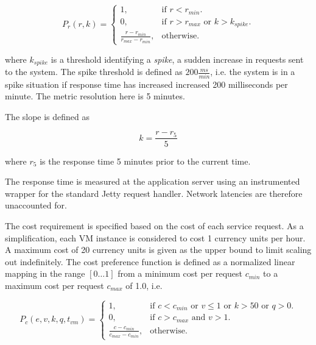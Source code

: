 \documentclass[english]{tktltiki2}
\theoremstyle{definition}
\theoremstyle{remark}
\begin{document}
\begin{equation}
P_{r}(r, k) = \begin{cases}
    1, & \text{if $r < r_{min}$}.\\
    0, & \text{if $r > r_{max}$ or $k > k_{spike}$}.\\
    \frac{r - r_{min}}
    	 {r_{max} - r_{min}}, & \text{otherwise}.
  \end{cases}
  \label{eq:responseTimePreference}
\end{equation}

where $k_{spike}$ is a threshold identifying a \textit{spike}, a sudden increase
in requests sent to the system. The spike threshold is defined as $200
\frac{ms}{min}$, i.e. the system is in a spike situation if response time has
increased increased 200 milliseconds per minute. The metric resolution here is 5
minutes.

The slope is defined as 

\begin{equation}
	k = \frac{r - r_{5}}{5}
  \label{eq:responseTimeSlope}
\end{equation}

where $r_{5}$ is the response time 5 minutes prior to the current time.

The response time is measured at the application server using an instrumented
wrapper for the standard Jetty request handler. Network latencies are therefore
unaccounted for.

The cost requirement is specified based on the cost of each service request. As
a simplification, each VM instance is considered to cost 1 currency units per
hour. A maximum cost of 20 currency units is given as the upper bound to limit
scaling out indefinitely. The cost preference function is defined as a
normalized linear mapping in the range $[0\dots1]$ from a minimum cost per
request $c_{min}$ to a maximum cost per request
$c_{max}$ of 1.0, i.e. 


\begin{equation}
P_{c}(e, v, k, q, t_{vm}) = \begin{cases}
    1, & \text{if $c < c_{min}$ or $v \leq 1$ or $k > 50$ or $q > 0$}.\\
    0, & \text{if $c > c_{max}$ and $v > 1$}.\\
    \frac{c - c_{min}}
    	 {c_{max} - c_{min}}, & \text{otherwise}.
  \end{cases}
  \label{eq:costPreference}
\end{equation}
\end{document}

